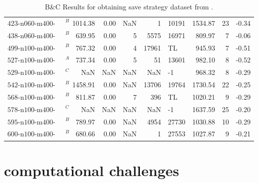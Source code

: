\begin{table}
\begin{tabular}{lrrrrlrrr}
        $\text{423-n060-m400-bt3}^B$   & 1014.38 & 0.00 & NaN   & 1      & 10191 & 1534.87 & 23    & -0.34        \\
        $\text{438-n060-m400-bt3}^B$   & 639.95  & 0.00 & 5     & 5575   & 16971 & 809.97  & 7     & -0.06        \\
        $\text{499-n100-m400-bt3}^B$   & 767.32  & 0.00 & 4     & 17961  & TL    & 945.93  & 7     & -0.51        \\
        $\text{527-n100-m400-bt3}^A$   & 737.34  & 0.00 & 5     & 51     & 13601 & 982.10  & 8     & -0.52        \\
        $\text{529-n100-m400-bt3}^C$   & NaN     & NaN  & NaN   & NaN    & -1    & 968.32  & 8     & -0.29        \\
        $\text{542-n100-m400-bt3}^B$   & 1458.91 & 0.00 & NaN   & 13706  & 19764 & 1730.54 & 22    & -0.25        \\
        $\text{568-n100-m400-bt100}^B$ & 811.87  & 0.00 & 7     & 396    & TL    & 1020.21 & 9     & -0.29        \\
        $\text{578-n100-m400-bt10}^C$  & NaN     & NaN  & NaN   & NaN    & -1    & 1637.59 & 25    & -0.20        \\
        $\text{595-n100-m400-bt10}^B$  & 789.97  & 0.00 & NaN   & 4954   & 27730 & 1030.88 & 10    & -0.29        \\
        $\text{600-n100-m400-bt100}^B$ & 680.66  & 0.00 & NaN   & 1      & 27553 & 1027.87 & 9     & -0.21        \\
        \bottomrule
    \end{tabular}

    \caption{B\&C Results for obtaining save strategy dataset from \krebsADataSet.}
    \label{tab:bc_results_krebs}
\end{table}

\clearpage
\section{\krebsADataSetText computational challenges}
\label{app:sec:krebs_computationally_challenges}

